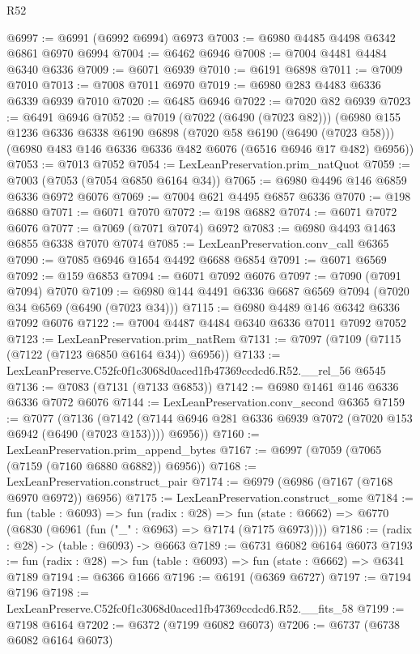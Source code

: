 \begin{lexlean}{R52}
\begin{coremodule}
@6997 := @6991 (@6992 @6994) @6973
@7003 := @6980 @4485 @4498 @6342 @6861 @6970 @6994
@7004 := @6462 @6946
@7008 := @7004 @4481 @4484 @6340 @6336
@7009 := @6071 @6939
@7010 := @6191 @6898
@7011 := @7009 @7010
@7013 := @7008 @7011 @6970
@7019 := @6980 @283 @4483 @6336 @6339 @6939 @7010
@7020 := @6485 @6946
@7022 := @7020 @82 @6939
@7023 := @6491 @6946
@7052 := @7019
    (@7022 (@6490 (@7023 @82)))
    (@6980
      @155
      @1236
      @6336
      @6338
      @6190
      @6898
      (@7020 @58 @6190 (@6490 (@7023 @58)))
      (@6980 @483 @146 @6336 @6336 @482 @6076 (@6516 @6946 @17 @482) @6956))
@7053 := @7013 @7052
@7054 := LexLeanPreservation.prim_natQuot
@7059 := @7003 (@7053 (@7054 @6850 @6164 @34))
@7065 := @6980 @4496 @146 @6859 @6336 @6972 @6076
@7069 := @7004 @621 @4495 @6857 @6336
@7070 := @198 @6880
@7071 := @6071 @7070
@7072 := @198 @6882
@7074 := @6071 @7072 @6076
@7077 := @7069 (@7071 @7074) @6972
@7083 := @6980 @4493 @1463 @6855 @6338 @7070 @7074
@7085 := LexLeanPreservation.conv_call @6365
@7090 := @7085 @6946 @1654 @4492 @6688 @6854
@7091 := @6071 @6569
@7092 := @159 @6853
@7094 := @6071 @7092 @6076
@7097 := @7090 (@7091 @7094) @7070
@7109 := @6980 @144 @4491 @6336 @6687 @6569 @7094 (@7020 @34 @6569 (@6490 (@7023 @34)))
@7115 := @6980 @4489 @146 @6342 @6336 @7092 @6076
@7122 := @7004 @4487 @4484 @6340 @6336 @7011 @7092 @7052
@7123 := LexLeanPreservation.prim_natRem
@7131 := @7097 (@7109 (@7115 (@7122 (@7123 @6850 @6164 @34)) @6956))
@7133 := LexLeanPreserve.C52fc0f1c3068d0aced1fb47369ccdcd6.R52.__rel_56 @6545
@7136 := @7083 (@7131 (@7133 @6853))
@7142 := @6980 @1461 @146 @6336 @6336 @7072 @6076
@7144 := LexLeanPreservation.conv_second @6365
@7159 := @7077
    (@7136
      (@7142 (@7144 @6946 @281 @6336 @6939 @7072 (@7020 @153 @6942 (@6490 (@7023 @153)))) @6956))
@7160 := LexLeanPreservation.prim_append_bytes
@7167 := @6997 (@7059 (@7065 (@7159 (@7160 @6880 @6882)) @6956))
@7168 := LexLeanPreservation.construct_pair
@7174 := @6979 (@6986 (@7167 (@7168 @6970 @6972)) @6956)
@7175 := LexLeanPreservation.construct_some
@7184 := fun (table : @6093) =>
  fun (radix : @28) =>
  fun (state : @6662) => @6770 (@6830 (@6961 (fun ("_" : @6963) => @7174 (@7175 @6973))))
@7186 := (radix : @28) -> (table : @6093) -> @6663
@7189 := @6731 @6082 @6164 @6073
@7193 := fun (radix : @28) => fun (table : @6093) => fun (state : @6662) => @6341 @7189
@7194 := @6366 @1666
@7196 := @6191 (@6369 @6727)
@7197 := @7194 @7196
@7198 := LexLeanPreserve.C52fc0f1c3068d0aced1fb47369ccdcd6.R52.__fits_58
@7199 := @7198 @6164
@7202 := @6372 (@7199 @6082 @6073)
@7206 := @6737 (@6738 @6082 @6164 @6073)

\end{coremodule}
\end{lexlean}
